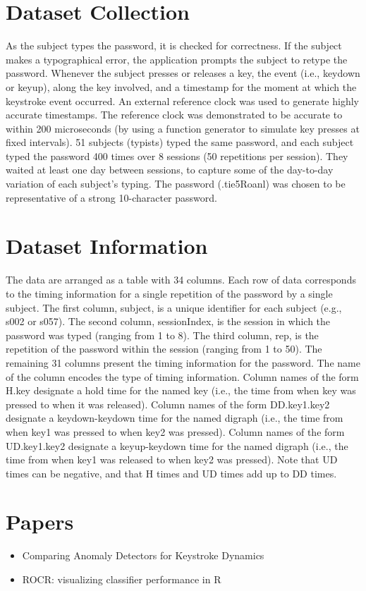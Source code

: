 \documentclass[a4paper,10pt]{article}
\begin{document}
\section{Dataset Collection}
As the subject types the password, it is checked for correctness. If the subject makes a typographical error, the application prompts the subject to retype the password.
Whenever the subject presses or releases a key, the event (i.e., keydown or keyup), along the key involved, and a timestamp for the moment at which the keystroke event occurred.
An external reference clock was used to generate highly accurate timestamps. The reference clock was demonstrated to be accurate to within 200 microseconds (by using a function generator to simulate key presses at fixed intervals).
51 subjects (typists) typed the same password, and each subject typed the password 400 times over 8 sessions (50 repetitions per session).
They waited at least one day between sessions, to capture some of the day-to-day variation of each subject's typing.
The password (.tie5Roanl) was chosen to be representative of a strong 10-character password.


\section{Dataset Information}
The data are arranged as a table with 34 columns. Each row of data corresponds to the timing information for a single repetition of the password by a single subject.
The first column, subject, is a unique identifier for each subject (e.g., s002 or s057). 
The second column, sessionIndex, is the session in which the password was typed (ranging from 1 to 8).
The third column, rep, is the repetition of the password within the session (ranging from 1 to 50).
The remaining 31 columns present the timing information for the password. The name of the column encodes the type of timing information. 
Column names of the form H.key designate a hold time for the named key (i.e., the time from when key was pressed to when it was released). 
Column names of the form DD.key1.key2 designate a keydown-keydown time for the named digraph (i.e., the time from when key1 was pressed to when key2 was pressed). 
Column names of the form UD.key1.key2 designate a keyup-keydown time for the named digraph (i.e., the time from when key1 was released to when key2 was pressed). Note that UD times can be negative, and that H times and UD times add up to DD times.



\section{Papers}
\begin{itemize}
 \item Comparing Anomaly Detectors for Keystroke Dynamics\cite{doi:10.1109/DSN.2009.5270346}
 \item ROCR: visualizing classifier performance in R \cite{doi:10.1093/bioinformatics/bti623}
\end{itemize}
\end{document}
